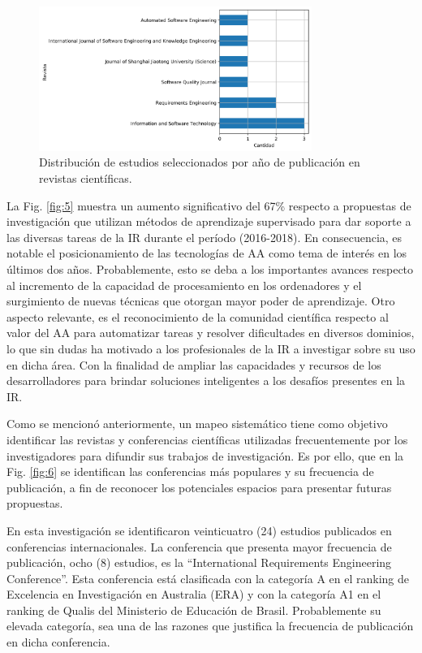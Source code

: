 \documentclass[journal]{IEEEtran}
\begin{document}
\begin{figure}[!t]
\centering
\includegraphics[width=3.5in]{figures/Figure7_Guada.png}
\caption{Distribuci\'on de estudios seleccionados por año de publicaci\'on en revistas científicas.}
\label{fig:7}
\end{figure}

La Fig. \ref{fig:5} muestra un aumento significativo del 67\% respecto a propuestas de investigación que utilizan métodos de aprendizaje supervisado para dar soporte a las diversas tareas de la IR durante el período (2016-2018). En consecuencia, es notable el posicionamiento de las tecnologías de AA como tema de interés en los últimos dos años. Probablemente, esto se deba a los importantes avances respecto al incremento de la capacidad de procesamiento en los ordenadores y el surgimiento de nuevas técnicas que otorgan mayor poder de aprendizaje. Otro aspecto relevante, es el reconocimiento de la comunidad científica respecto al valor del AA para automatizar tareas y resolver dificultades en diversos dominios, lo que sin dudas ha motivado a los profesionales de la IR a investigar sobre su uso en dicha área. Con la finalidad de ampliar las capacidades y recursos de los desarrolladores para brindar soluciones inteligentes a los desafíos presentes en la IR. 

Como se mencionó anteriormente, un mapeo sistemático tiene como objetivo identificar las revistas y conferencias científicas utilizadas frecuentemente por los investigadores para difundir sus trabajos de investigación. Es por ello, que en la Fig. \ref{fig:6} se identifican las conferencias más populares y su frecuencia de publicación, a fin de reconocer los potenciales espacios para presentar futuras propuestas. 

En esta investigación se identificaron veinticuatro (24) estudios publicados en conferencias internacionales. La conferencia que presenta mayor frecuencia de publicación, ocho (8) estudios, es la “International Requirements Engineering Conference”. Esta conferencia está clasificada con la categoría A en el ranking de Excelencia en Investigación en Australia (ERA) y con la categoría A1 en el ranking de Qualis del Ministerio de Educación de Brasil. Probablemente su elevada categoría, sea una de las razones que justifica la frecuencia de publicación en dicha conferencia. 
\end{document}
